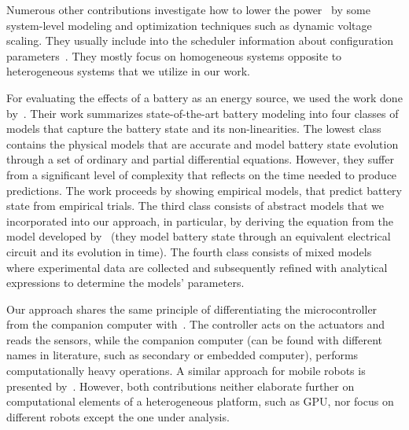 Numerous other contributions investigate how to lower the power~\citep{hong1999power, luo2001battery, chowdhury2005static} by some system-level modeling and optimization techniques such as dynamic voltage scaling. They usually include into the scheduler information about configuration parameters~\citep{seewald2019coarse}. They mostly focus on homogeneous systems opposite to heterogeneous systems that we utilize in our work. 






 



For evaluating the effects of a battery as an energy source, we used the work done by~\citep{rao2003battery}. Their work summarizes state-of-the-art battery modeling into four classes of models that capture the battery state and its non-linearities. The lowest class contains the physical models that are accurate and model battery state evolution through a set of ordinary and partial differential equations. However, they suffer from a significant level of complexity that reflects on the time needed to produce predictions. The work proceeds by showing empirical models, that predict battery state from empirical trials. The third class consists of abstract models that we incorporated into our approach, in particular, by deriving the equation from the model developed by~\citep{hasan2018exogenous} (they model battery state through an equivalent electrical circuit and its evolution in time). The fourth class consists of mixed models where experimental data are collected and subsequently refined with analytical expressions to determine the models' parameters.


Our approach shares the same principle of differentiating the microcontroller from the companion computer with~\citep{mei2004energy, mei2005case}. The controller acts on the actuators and reads the sensors, while the companion computer (can be found with different names in literature, such as secondary or embedded computer), performs computationally heavy operations. A similar approach for mobile robots is presented by~\citep{dressler2005energy}. However, both contributions neither elaborate further on computational elements of a heterogeneous platform, such as GPU, nor focus on different robots except the one under analysis.

